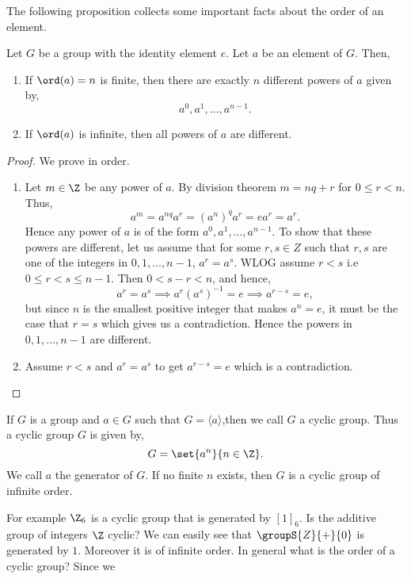 The following proposition collects some important facts about the order of an element.
\begin{Proposition}\label{prop:order_of_element}
    Let $G$ be a group with the identity element $e$. Let $a$ be an element of $G$. Then,
    \begin{enumerate}
	\item
	    If $\ord(a) = n$ is finite, then there are exactly $n$ different powers of $a$ given by,
	    \[a^0,a^1,\ldots,a^{n-1}.\] 
	\item
	    If $\ord(a)$ is infinite, then all powers of $a$ are different.
    \end{enumerate}
\end{Proposition}
\begin{proof}
    We prove in order.
    \begin{enumerate}
	\item
	    Let $m \in \Z$ be any power of $a$. By division theorem $m = nq + r$ for $0\leq r < n$. Thus,
	    \[a^{m} = a^{nq}a^{r} = {(a^{n})}^{q}a^{r} = e a^r = a^r.\]
	    Hence any power of $a$ is of the form $a^0,a^1,\ldots,a^{n-1}$. To show that these powers are
	    different, let us assume that for some $r,s \in Z$ such that $r,s$ are one of the integers in
	    $0,1,\ldots,n-1$, $a^r = a^s$. WLOG assume $r < s$ i.e~$0\leq r < s \leq n-1$. Then $0 < s-r < n$,
	    and hence,
	    \[a^{r} = a^s \implies a^{r}{(a^s)}^{-1} = e \implies a^{r-s} = e,\]
	    but since $n$ is the smallest positive integer that makes $a^n = e$, it must be the case that
	    $r=s$ which gives us a contradiction. Hence the powers in $0,1,\ldots,n-1$ are different.
	\item
	    Assume $r < s$ and $a^r = a^s$ to get $a^{r-s} = e$ which is a contradiction.
    \end{enumerate}
\end{proof}
\begin{Definition}[name=Cyclic group]
    If $G$ is a group and $a \in G$ such that $G = \langle a \rangle$,then we call $G$ a cyclic group. Thus a
    cyclic group $G$ is given by,
    \[G = \set{a^n}{n\in\Z}.\]
    We call $a$ the generator of $G$. If no finite $n$ exists, then $G$ is a cyclic group of infinite order.
\end{Definition}
For example $\Z_{6}$
is a cyclic group that is generated by ${\left[1\right]}_6$. Is the additive group of integers $\Z$ cyclic? We
can easily see that $\groupS{Z}{+}{0}$ is generated by $1$. Moreover it is of infinite order. 
In general what is the order of a cyclic group? Since we
